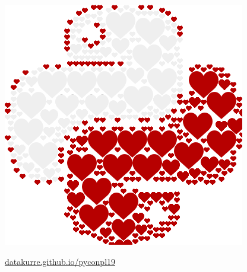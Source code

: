\documentclass[10pt,aspectratio=169]{beamer}
\begin{document}
\begin{frame}[standout]
\vfill
\includegraphics[height=0.50\paperheight]{images/pyconplhearts.png}
\par
\href{https://datakurre.github.io/pyconpl19/}{datakurre.github.io/pyconpl19}
\end{frame}

\end{document}
